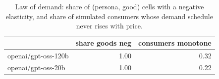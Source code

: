 \begin{table}[!htbp]\centering\small
\caption{Law of demand: share of (persona, good) cells with a negative elasticity, and share of simulated consumers whose demand schedule never rises with price.}\label{tab:law_of_demand}
\begin{tabular}{lrr}
\hline
 & share goods neg & consumers monotone \\ \hline
openai/gpt-oss-120b & 1.00 & 0.32 \\
openai/gpt-oss-20b & 1.00 & 0.22 \\
\hline
\end{tabular}
\end{table}